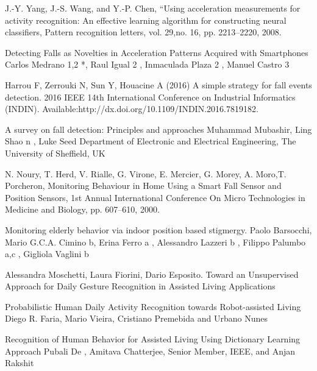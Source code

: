 \documentclass[a4paper, parskip=full]{scrartcl}
\begin{document}
\begin{thebibliography}{9}
J.-Y. Yang, J.-S. Wang, and Y.-P. Chen, “Using acceleration measurements for activity recognition: An effective learning algorithm for constructing neural classifiers, Pattern recognition letters, vol. 29,no. 16, pp. 2213–2220, 2008.

Detecting Falls as Novelties in Acceleration Patterns Acquired with Smartphones
Carlos Medrano 1,2 *, Raul Igual 2 , Inmaculada Plaza 2 , Manuel Castro 3


Harrou F, Zerrouki N, Sun Y, Houacine A (2016) A simple strategy for fall events detection. 2016 IEEE 14th International Conference on Industrial Informatics
(INDIN). Available:http://dx.doi.org/10.1109/INDIN.2016.7819182.


A survey on fall detection: Principles and approaches Muhammad Mubashir, Ling Shao n , Luke Seed Department of Electronic and Electrical Engineering, The University of Sheffield, UK

N. Noury, T. Herd, V. Rialle, G. Virone, E. Mercier, G. Morey, A. Moro,T. Porcheron, Monitoring Behaviour in Home Using a Smart Fall Sensor and Position Sensors, 1st Annual International Conference On Micro Technologies in Medicine and Biology, pp. 607–610, 2000.

Monitoring elderly behavior via indoor position based stigmergy.
Paolo Barsocchi, Mario G.C.A. Cimino b, Erina Ferro a , Alessandro Lazzeri b ,
Filippo Palumbo a,c , Gigliola Vaglini b


Alessandra	Moschetti, Laura Fiorini, Dario Esposito.
Toward an Unsupervised Approach for Daily Gesture Recognition in Assisted Living Applications

Probabilistic Human Daily Activity Recognition towards Robot-assisted Living
Diego R. Faria, Mario Vieira, Cristiano Premebida and Urbano Nunes

Recognition of Human Behavior for Assisted Living Using Dictionary Learning Approach
Pubali De , Amitava Chatterjee, Senior Member, IEEE, and Anjan Rakshit	
	
\end{thebibliography}
 
\end{document}
